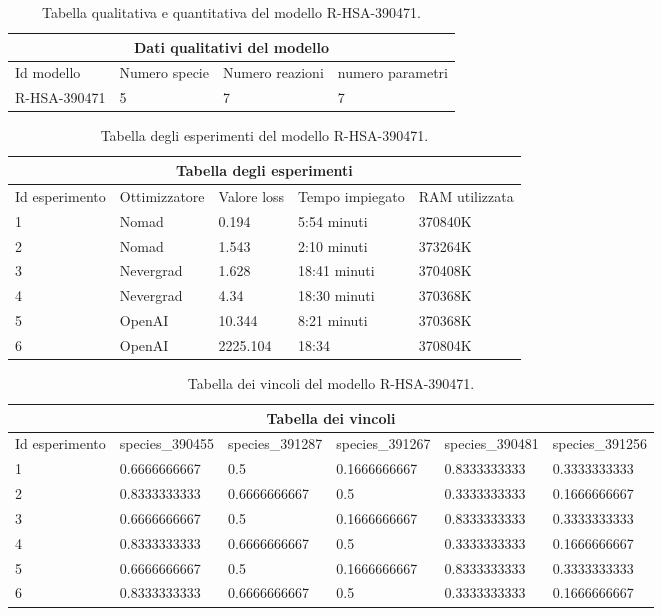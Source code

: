 \begin{table}
\centering
\begin{tabular}{ |p{3cm}||p{3cm}|p{3cm}|p{3cm}|  }
 \hline
 \multicolumn{4}{|c|}{Dati qualitativi del modello} \\
 \hline
 Id modello& Numero specie &Numero reazioni&numero parametri\\
 \hline
 R-HSA-390471   & 5    &7&   7\\
 \hline
\end{tabular}
\caption{Tabella qualitativa e quantitativa del modello R-HSA-390471.}
\label{table:qual-R-HSA-390471}
\end{table}

\begin{table}
\centering
\begin{tabular}{ |p{2cm}||p{2.5cm}|p{2cm}|p{2.1cm}|p{2cm}|  }
 \hline
 \multicolumn{5}{|c|}{Tabella degli esperimenti} \\
 \hline
 Id esperimento&Ottimizzatore&Valore loss&Tempo impiegato&RAM utilizzata\\
 \hline
 1 & Nomad & 0.194& 5:54 minuti & 370840K\\
 \hline
 2 & Nomad & 1.543 & 2:10 minuti & 373264K\\
 \hline
 3 & Nevergrad & 1.628  & 18:41 minuti & 370408K\\
 \hline
 4 & Nevergrad & 4.34& 18:30 minuti & 370368K\\
 \hline
 5 & OpenAI & 10.344  & 8:21 minuti & 370368K\\
 \hline
 6 & OpenAI & 2225.104& 18:34 & 370804K\\
 \hline
\end{tabular}
\caption{Tabella degli esperimenti del modello R-HSA-390471.}
\label{table:es-R-HSA-390471}
\end{table}

\begin{table}
\centering
\begin{tabular}{ |p{2cm}||p{2.3cm}|p{2.3cm}|p{2.3cm}|p{2.3cm}|p{2.3cm}|}
 \hline
 \multicolumn{6}{|c|}{Tabella dei vincoli} \\
 \hline
Id esperimento & species\_390455 & species\_391287 & species\_391267 & species\_390481 & species\_391256 \\
\hline
1 & 0.6666666667 & 0.5 & 0.1666666667 & 0.8333333333 & 0.3333333333 \\
\hline
2 & 0.8333333333 & 0.6666666667 & 0.5 & 0.3333333333 & 0.1666666667 \\
\hline
3 & 0.6666666667 & 0.5 & 0.1666666667 & 0.8333333333 & 0.3333333333 \\
\hline
4 & 0.8333333333 & 0.6666666667 & 0.5 & 0.3333333333 & 0.1666666667 \\
\hline
5 & 0.6666666667 & 0.5 & 0.1666666667 & 0.8333333333 & 0.3333333333 \\
\hline
6 & 0.8333333333 & 0.6666666667 & 0.5 & 0.3333333333 & 0.1666666667 \\
\hline
\end{tabular}
\caption{Tabella dei vincoli del modello R-HSA-390471.}
\label{table:vin-R-HSA-390471}
\end{table}

